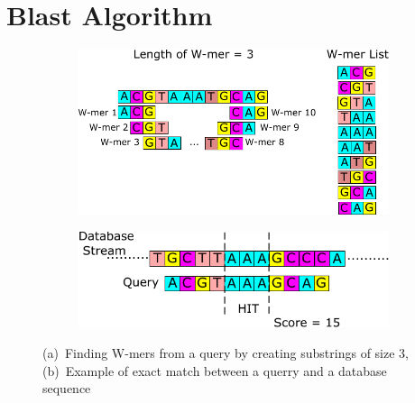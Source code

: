\section{Blast Algorithm}
\label{sec:blast}

\begin{figure}[t!]
\centering
	\begin{subfigure}[]
    \centering
    \includegraphics[width=\columnwidth]{Figures/Algorithm1.pdf} 
    \end{subfigure}
	\begin{subfigure}[]
    \centering
    \includegraphics[width=\columnwidth]{Figures/Algorithm2.pdf}
	\end{subfigure}
	\caption{(a)~Finding W-mers from a query by creating substrings of size 3, (b)~Example of exact match between a querry and a database sequence}
	\label{fig:step12}
\end{figure}

